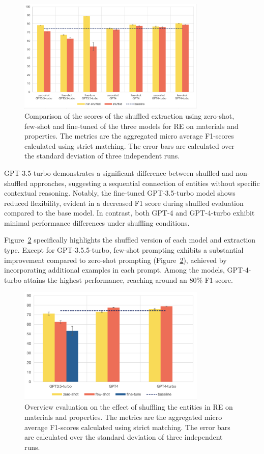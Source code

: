 \documentclass[a4paper]{article}
\begin{document}
\begin{figure}[htbp]
  \centering
  \includegraphics[width=0.8\textwidth]{figures/re-eval-all.png} 
  \caption{Comparison of the scores of the shuffled extraction using zero-shot, few-shot and fine-tuned of the three models for RE on materials and properties. The metrics are the aggregated micro average F1-scores calculated using strict matching. The error bars are calculated over the standard deviation of three independent runs.}
  \label{fig:re-eval-all}
\end{figure}

GPT-3.5-turbo demonstrates a significant difference between shuffled and non-shuffled approaches, suggesting a sequential connection of entities without specific contextual reasoning. 
Notably, the fine-tuned GPT-3.5-turbo model shows reduced flexibility, evident in a decreased F1 score during shuffled evaluation compared to the base model. 
In contrast, both GPT-4 and GPT-4-turbo exhibit minimal performance differences under shuffling conditions.

Figure~\ref{fig:re-eval-shuffled-all} specifically highlights the shuffled version of each model and extraction type. Except for GPT-3.5.5-turbo, few-shot prompting exhibits a substantial improvement compared to zero-shot prompting (Figure~\ref{fig:re-eval-shuffled-all}), achieved by incorporating additional examples in each prompt. 
Among the models, GPT-4-turbo attains the highest performance, reaching around an 80\% F1-score.

\begin{figure}[htbp]
  \centering
  \includegraphics[width=0.8\textwidth]{figures/re-eval-shuffled-all.png} 
  \caption{Overview evaluation on the effect of shuffling the entities in RE on materials and properties. The metrics are the aggregated micro average F1-scores calculated using strict matching. The error bars are calculated over the standard deviation of three independent runs.}
  \label{fig:re-eval-shuffled-all}
\end{figure}
\end{document}
